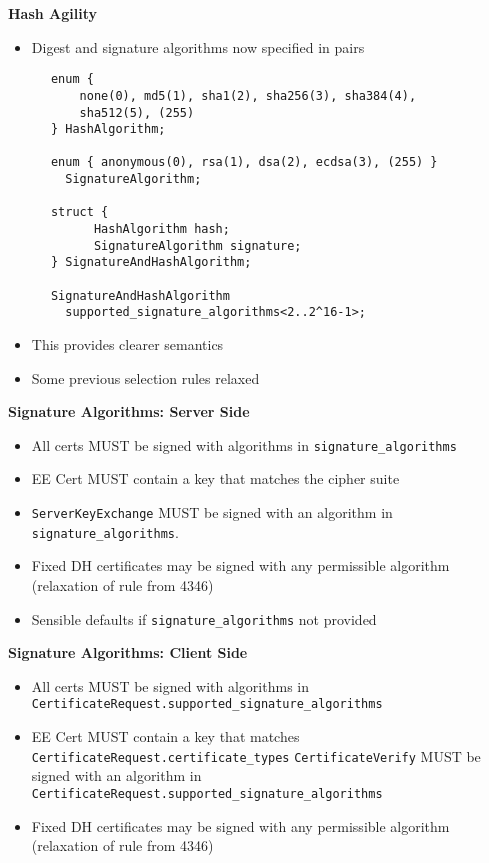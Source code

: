 \documentclass[helvetica]{seminar}
\newcommand{\heading}[1]{%
  \begin{center} 
    \large\bf 
    #1 
  \end{center} 
  \vspace{.4 in}}
\begin{document}
\begin{slide}
\heading{Hash Agility}

\begin{itemize}
\item Digest and signature algorithms now specified in
      pairs
\end{itemize}


{\tiny
\begin{verbatim}
      enum {
          none(0), md5(1), sha1(2), sha256(3), sha384(4),
          sha512(5), (255)
      } HashAlgorithm;

      enum { anonymous(0), rsa(1), dsa(2), ecdsa(3), (255) }
        SignatureAlgorithm;

      struct {
            HashAlgorithm hash;
            SignatureAlgorithm signature;
      } SignatureAndHashAlgorithm;

      SignatureAndHashAlgorithm
        supported_signature_algorithms<2..2^16-1>;
\end{verbatim}
}

\begin{itemize}
\item This provides clearer semantics
\item Some previous selection rules relaxed
\end{itemize}
\end{slide}


\begin{slide}
\heading{Signature Algorithms: Server Side}
\begin{itemize}
\item All certs MUST be signed with algorithms in \verb^signature_algorithms^
\item EE Cert MUST contain a key that matches the cipher suite
\item \verb^ServerKeyExchange^ MUST be signed with an algorithm in
\verb^signature_algorithms^.
\item Fixed DH certificates may be signed with any permissible algorithm (relaxation of rule from 4346)
\item Sensible defaults if \verb^signature_algorithms^ not provided
\end{itemize}
\end{slide}


\begin{slide}
\heading{Signature Algorithms: Client Side}
\begin{itemize}
\item All certs MUST be signed with algorithms in \verb^CertificateRequest.supported_signature_algorithms^
\item EE Cert MUST contain a key that matches \verb^CertificateRequest.certificate_types^
\verb^CertificateVerify^ MUST be signed with an algorithm in
\verb^CertificateRequest.supported_signature_algorithms^
\item Fixed DH certificates may be signed with any permissible algorithm (relaxation of rule from 4346)
\end{itemize}
\end{slide}
\end{document}
